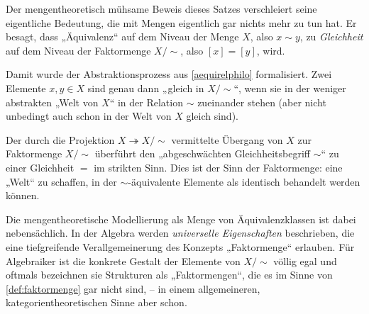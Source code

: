 \begin{bem}
    Der mengentheoretisch mühsame Beweis dieses Satzes verschleiert seine eigentliche Bedeutung, die mit Mengen eigentlich gar nichts mehr zu tun hat. Er besagt, dass „Äquivalenz“ auf dem Niveau der Menge $X$, also $x\sim y$, zu \emph{Gleichheit} auf dem Niveau der Faktormenge $X/{\sim}$, also $[x]=[y]$, wird.
    
    Damit wurde der Abstraktionsprozess aus \cref{aequirelphilo} formalisiert. Zwei Elemente $x,y\in X$ sind genau dann „gleich in $X/{\sim}$“, wenn sie in der weniger abstrakten „Welt von $X$“ in der Relation $\sim$ zueinander stehen (aber nicht unbedingt auch schon in der Welt von $X$ gleich sind).

    Der durch die Projektion $X\twoheadrightarrow X/{\sim}$ vermittelte Übergang von $X$ zur Faktormenge $X/{\sim}$ überführt den „abgeschwächten Gleichheitsbegriff $\sim$“ zu einer Gleichheit $=$ im strikten Sinn. Dies ist der Sinn der Faktormenge: eine „Welt“ zu schaffen, in der $\sim$-äquivalente Elemente als identisch behandelt werden können.
    
    Die mengentheoretische Modellierung als Menge von Äquivalenzklassen ist dabei nebensächlich. In der Algebra werden \emph{universelle Eigenschaften} beschrieben, die eine tiefgreifende Verallgemeinerung des Konzepts „Faktormenge“ erlauben. Für Algebraiker ist die konkrete Gestalt der Elemente von $X/{\sim}$ völlig egal und oftmals bezeichnen sie Strukturen als „Faktormengen“, die es im Sinne von \cref{def:faktormenge} gar nicht sind, -- in einem allgemeineren, kategorientheoretischen Sinne aber schon.
\end{bem}


